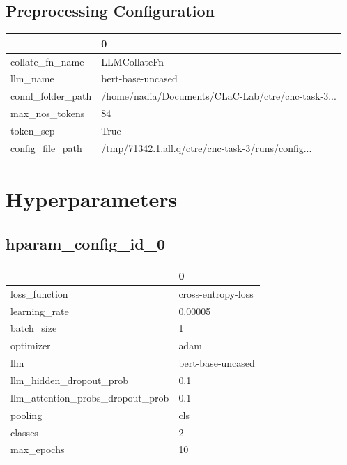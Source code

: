 \documentclass{article}
\begin{document}
\subsection{Preprocessing Configuration}
\begin{tabular}{ll}
\toprule
{} &                                                  0 \\
\midrule
collate\_fn\_name   &                                       LLMCollateFn \\
llm\_name          &                                  bert-base-uncased \\
connl\_folder\_path &  /home/nadia/Documents/CLaC-Lab/ctre/cnc-task-3... \\
max\_nos\_tokens    &                                                 84 \\
token\_sep         &                                               True \\
config\_file\_path  &  /tmp/71342.1.all.q/ctre/cnc-task-3/runs/config... \\
\bottomrule
\end{tabular}

\section{Hyperparameters}
\subsection{hparam\_config\_id\_0}
\begin{tabular}{ll}
\toprule
{} &                   0 \\
\midrule
loss\_function                    &  cross-entropy-loss \\
learning\_rate                    &             0.00005 \\
batch\_size                       &                   1 \\
optimizer                        &                adam \\
llm                              &   bert-base-uncased \\
llm\_hidden\_dropout\_prob          &                 0.1 \\
llm\_attention\_probs\_dropout\_prob &                 0.1 \\
pooling                          &                 cls \\
classes                          &                   2 \\
max\_epochs                       &                  10 \\
\bottomrule
\end{tabular}
\end{document}
